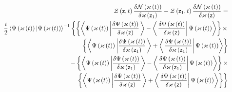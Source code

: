 \begin{eqnarray}
&&{\cal Z}\left( {\sf z},t\right) \frac{\delta {\cal N}\left( \varkappa
\left( t\right) \right) }{\delta \varkappa \left( {\sf z}_{1}\right) }-{\cal %
Z}\left( {\sf z}_{1},t\right) \frac{\delta {\cal N}\left( \varkappa \left(
t\right) \right) }{\delta \varkappa \left( {\sf z}\right) }=  \nonumber \\
&&\frac{i}{2}\left\langle \Psi \left( {\cal \varkappa }\left( t\right)
\right) |\Psi \left( {\cal \varkappa }\left( t\right) \right) \right\rangle
^{-1}\left\{ \left\{ \left\langle \Psi \left( {\cal \varkappa }\left(
t\right) \right) \left| \frac{\delta \Psi \left( {\cal \varkappa }\left(
t\right) \right) }{\delta {\cal \varkappa }\left( {\sf z}\right) }\right.
\right\rangle -\left\langle \left. \frac{\delta \Psi \left( {\cal \varkappa }%
\left( t\right) \right) }{\delta {\cal \varkappa }\left( {\sf z}\right) }%
\right| \Psi \left( {\cal \varkappa }\left( t\right) \right) \right\rangle
\right\} \times \right.  \nonumber \\
&&\qquad \qquad \qquad \qquad \qquad \qquad \qquad \left\{ \left\langle \Psi
\left( {\cal \varkappa }\left( t\right) \right) \left| \frac{\delta \Psi
\left( {\cal \varkappa }\left( t\right) \right) }{\delta {\cal \varkappa }%
\left( {\sf z}_{1}\right) }\right. \right\rangle +\left\langle \left. \frac{%
\delta \Psi \left( {\cal \varkappa }\left( t\right) \right) }{\delta {\cal %
\varkappa }\left( {\sf z}_{1}\right) }\right| \Psi \left( {\cal \varkappa }%
\left( t\right) \right) \right\rangle \right\}  \nonumber \\
&&-\left\{ \left\langle \Psi \left( {\cal \varkappa }\left( t\right) \right)
\left| \frac{\delta \Psi \left( {\cal \varkappa }\left( t\right) \right) }{%
\delta {\cal \varkappa }\left( {\sf z}_{1}\right) }\right. \right\rangle
-\left\langle \left. \frac{\delta \Psi \left( {\cal \varkappa }\left(
t\right) \right) }{\delta {\cal \varkappa }\left( {\sf z}_{1}\right) }%
\right| \Psi \left( {\cal \varkappa }\left( t\right) \right) \right\rangle
\right\} \times  \nonumber \\
&&\qquad \qquad \qquad \qquad \qquad \qquad \qquad \left. \left\{
\left\langle \Psi \left( {\cal \varkappa }\left( t\right) \right) \left| 
\frac{\delta \Psi \left( {\cal \varkappa }\left( t\right) \right) }{\delta 
{\cal \varkappa }\left( {\sf z}\right) }\right. \right\rangle +\left\langle
\left. \frac{\delta \Psi \left( {\cal \varkappa }\left( t\right) \right) }{%
\delta {\cal \varkappa }\left( {\sf z}\right) }\right| \Psi \left( {\cal %
\varkappa }\left( t\right) \right) \right\rangle \right\} \right\}  \nonumber

\end{eqnarray}
